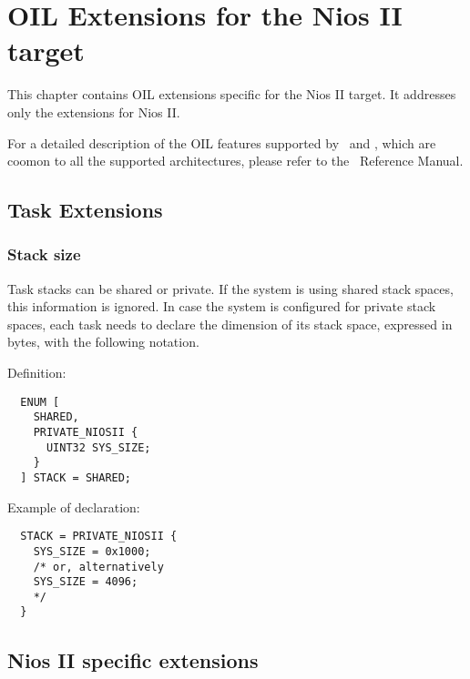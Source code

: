 \chapter{OIL Extensions for the Nios II target}

This chapter contains OIL extensions specific for the Nios II target. It
addresses only the extensions for Nios II.

For a detailed description of the OIL features supported by \ee\ and \rtd,
which are coomon to all the supported architectures, please refer to the
\rtd\ Reference Manual. 

\section{Task Extensions}

\subsection{Stack size}

Task stacks can be shared or private. If the system is using shared
stack spaces, this information is ignored. In case the system is
configured for private stack spaces, each task needs to declare the
dimension of its stack space, expressed in bytes, with the following 
notation.

Definition:

\begin{lstlisting}
  ENUM [
    SHARED,
    PRIVATE_NIOSII {
      UINT32 SYS_SIZE;
    }
  ] STACK = SHARED;
\end{lstlisting}

Example of declaration:

\begin{lstlisting}
  STACK = PRIVATE_NIOSII {
    SYS_SIZE = 0x1000;
    /* or, alternatively
    SYS_SIZE = 4096;
    */
  }
\end{lstlisting}

\section{Nios II specific extensions}


